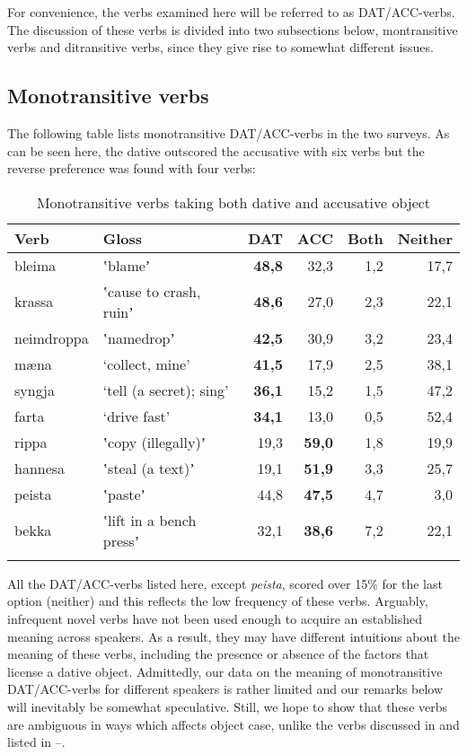 \documentclass[output=paper,modfonts,nonflat,colorlinks,citecolor=brown]{langsci/langscibook}
\begin{document}
For convenience, the verbs examined here will be referred to as DAT/ACC-verbs. The discussion of these verbs is divided into two subsections below, montransitive verbs and ditransitive verbs, since they give rise to somewhat different issues.

\subsection{Monotransitive verbs} %
\label{sec:jonsson:4.1}

The following table lists monotransitive DAT/ACC-verbs in the two surveys. As can be seen here, the dative outscored the accusative with six verbs but the reverse preference was found with four verbs:

\begin{table}
{\caption{\label{tab:jonsson:4}Monotransitive verbs taking both dative and accusative object} }
\begin{tabularx}{\textwidth}{XXrrrr}
\lsptoprule
Verb & Gloss & \textbf{DAT} & ACC & Both & Neither\\
\midrule
bleima & ʽblameʼ & \textbf{48,8} & 32,3 & 1,2 & 17,7\\
krassa & ʽcause to crash, ruinʼ & \textbf{48,6} & 27,0 & 2,3 & 22,1\\
neimdroppa & ʽnamedropʼ & \textbf{42,5} & 30,9 & 3,2 & 23,4\\
mæna & ‘collect, mine’ & \textbf{41,5} & 17,9 & 2,5 & 38,1\\
syngja & ‘tell (a secret); sing’ & \textbf{36,1} & 15,2 & 1,5 & 47,2\\
farta & ‘drive fast’ & \textbf{34,1} & 13,0 & 0,5 & 52,4\\
rippa & ʽcopy (illegally)ʼ & 19,3 & \textbf{59,0} & 1,8 & 19,9\\
hannesa & ʽsteal (a text)ʼ & 19,1 & \textbf{51,9} & 3,3 & 25,7\\
peista & ʽpasteʼ & 44,8 & \textbf{47,5} & 4,7 & 3,0\\
bekka & ʽlift in a bench pressʼ & 32,1 & \textbf{38,6} & 7,2 & 22,1\\
\lspbottomrule
\end{tabularx}
\end{table}

All the DAT/ACC-verbs listed here, except \textit{peista}, scored over 15\% for the last option (neither) and this reflects the low frequency of these verbs. Arguably, infrequent novel verbs have not been used enough to acquire an established meaning across speakers. As a result, they may have different intuitions about the meaning of these verbs, including the presence or absence of the factors that license a dative object. Admittedly, our data on the meaning of monotransitive DAT/ACC-verbs for different speakers is rather limited and our remarks below will inevitably be somewhat speculative. Still, we hope to show that these verbs are ambiguous in ways which affects object case, unlike the verbs discussed in  and listed in --.
\end{document}
